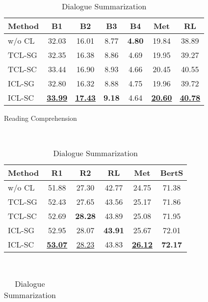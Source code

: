 \begin{table}[t]
	\small
	\centering
	\begin{subtable}{\linewidth}
		\scriptsize
		\centering
		\begin{tabular}{lcccccc}
			\hline
			{Method} & {B1} & {B2} & {B3} & {B4} & {Met} & {RL}\\
			\hline
			w/o CL &  32.03 & 16.01 & 8.77 & \textbf{4.80} & 19.84 & 38.89\\
			TCL-SG &  32.35 & 16.38 & 8.86 & 4.69 & 19.95 & 39.27 \\
			\hline
			TCL-SC & 33.44 & 16.90 & 8.93 & 4.66 & 20.45 & 40.55\\
			ICL-SG & 32.80 & 16.32 & 8.88 & 4.75 & 19.96 & 39.72 \\
			ICL-SC &  \underline{\textbf{33.99}} & \underline{\textbf{17.43}} & {\textbf{9.18 }}& 4.64 & \underline{\textbf{20.60}}& \underline{\textbf{40.78}}\\
			\hline
		\end{tabular}
		\caption{Reading Comprehension}
		\label{tab:end2endrc}
	\end{subtable}
	\\[5pt]
	\begin{subtable}{\linewidth}
		\scriptsize
		\centering
		\begin{tabular}{lccccc}
			\hline
			{Method} & {R1} & {R2} & {RL} & {Met} & {BertS} \\
			\hline
			w/o CL & 51.88 & 27.30 & 42.77 & 24.75 & 71.38 \\
			TCL-SG & 52.43 & 27.65 & 43.56 & 25.17 & 71.86 \\
			\hline
			TCL-SC & 52.69 & \textbf{28.28 }& 43.89 & 25.08 & 71.95 \\
			ICL-SG & 52.95 & 28.07 & \textbf{43.91} & 25.67 & 72.01 \\
			ICL-SC & \underline{\textbf{53.07}} & \underline{28.23} & {43.83} & \underline{\textbf{26.12}}& {\textbf{72.17}} \\
			
			\hline
		\end{tabular}
		\caption{Dialogue Summarization}
		\label{tab:end2endds}
	\end{subtable}
	\\[5pt]
	\begin{subtable}{\linewidth}
		\scriptsize
		\centering
		\begin{tabular}{lccccc}
			

\end{tabular}
\end{subtable}
\end{table}
